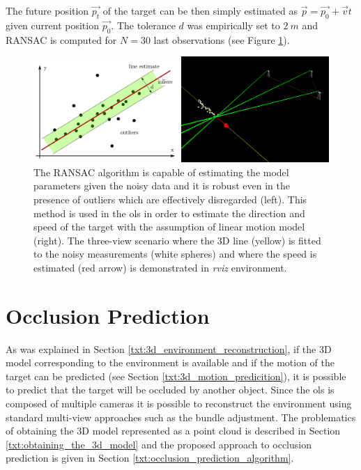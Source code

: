 The future position $\vec{p_{t}}$ of the target can be then simply estimated as $\vec{p} = \vec{p_{0}} + \vec{v}t$ given current position $\vec{p_{0}}$. The tolerance $d$ was empirically set to $2~m$ and RANSAC is computed for $N = 30$ last observations (see Figure \ref{fig:ransac}).

\begin{figure}[htb]
	\centering
	\includegraphics[width=0.8\linewidth]{fig/ransac_theory_rviz.png}
	\caption{The RANSAC algorithm is capable of estimating the model parameters given the noisy data and it is robust even in the presence of outliers which are effectively disregarded (left). This method is used in the \gls{ols} in order to estimate the direction and speed of the target with the assumption of linear motion model (right). The three-view scenario where the 3D line (yellow) is fitted to the noisy measurements (white spheres) and where the speed is estimated (red arrow) is demonstrated in \textit{rviz} environment.}
	\label{fig:ransac}
\end{figure}

\section{Occlusion Prediction} \label{txt:occlusion_prediction}

As was explained in Section \ref{txt:3d_environment_reconstruction}, if the 3D model corresponding to the environment is available and if the motion of the target can be predicted (see Section \ref{txt:3d_motion_predicition}), it is possible to predict that the target will be occluded by another object. Since the \gls{ols} is composed of multiple cameras it is possible to reconstruct the environment using standard multi-view approaches such as the bundle adjustment. The problematics of obtaining the 3D model represented as a point cloud is described in Section \ref{txt:obtaining_the_3d_model} and the proposed approach to occlusion prediction is given in Section \ref{txt:occlusion_prediction_algorithm}.

